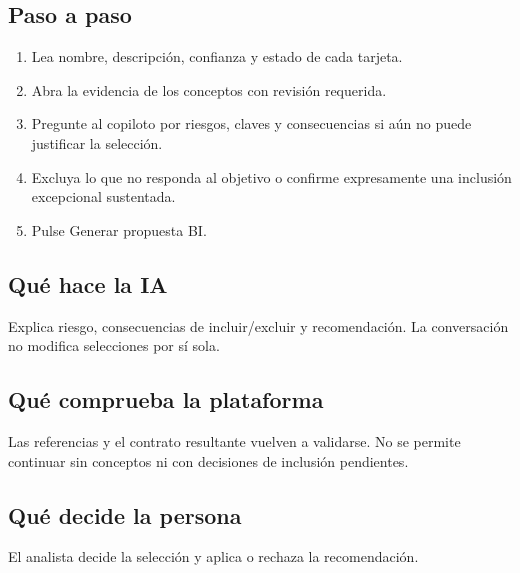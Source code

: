 \subsection{Paso a paso}
\begin{enumerate}
\item Lea nombre, descripción, confianza y estado de cada tarjeta.\par\nopagebreak[4]
\item Abra la evidencia de los conceptos con revisión requerida.\par\nopagebreak[4]
\item Pregunte al copiloto por riesgos, claves y consecuencias si aún no puede justificar la selección.\par\nopagebreak[4]
\item Excluya lo que no responda al objetivo o confirme expresamente una inclusión excepcional sustentada.\par\nopagebreak[4]
\item Pulse Generar propuesta BI.\par\nopagebreak[4]
\end{enumerate}
\subsection{Qué hace la IA}
Explica riesgo, consecuencias de incluir/excluir y recomendación. La conversación no modifica selecciones por sí sola.

\subsection{Qué comprueba la plataforma}
Las referencias y el contrato resultante vuelven a validarse. No se permite continuar sin conceptos ni con decisiones de inclusión pendientes.

\subsection{Qué decide la persona}
El analista decide la selección y aplica o rechaza la recomendación.

